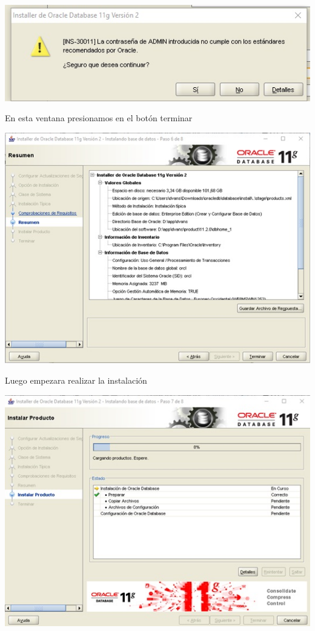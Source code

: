 \begin{flushleft}
\begin{center}
\includegraphics{images/image-10}\\
\end{center}
En esta ventana presionamos en el botón terminar\\
\begin{center}
\includegraphics{images/image-11}\\
\end{center}
Luego empezara realizar la instalación\\
\begin{center}
\includegraphics{images/image-12}\\

\end{center}
\end{flushleft}
